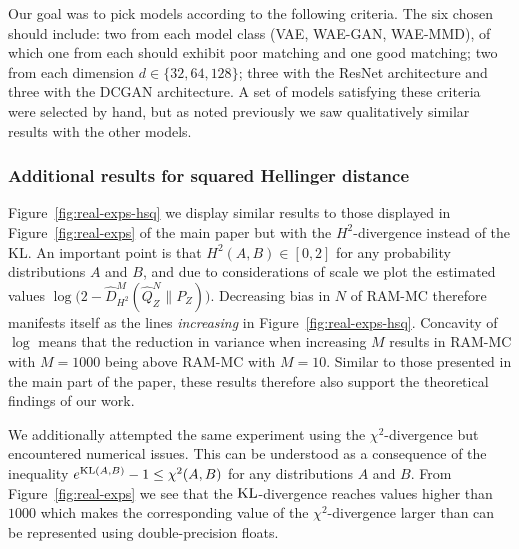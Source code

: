 Our goal was to pick models according to the following criteria. 
The six chosen should include: two from each model class (VAE, WAE-GAN, WAE-MMD), of which one from each should exhibit poor matching and one good matching; two from each dimension $d\in\{32, 64, 128\}$; three with the ResNet architecture and three with the DCGAN architecture.
A set of models satisfying these criteria were selected by hand, but as noted previously we saw qualitatively similar results with the other models.

\subsubsection{Additional results for squared Hellinger distance}\label{appendix:sq-hellinger-results}

Figure~\ref{fig:real-exps-hsq} we display similar results to those displayed in Figure~\ref{fig:real-exps} of the main paper but with the $H^2$-divergence instead of the KL.
An important point is that $H^2(A,B) \in [0, 2]$ for any probability distributions $A$ and $B$,
and due to considerations of scale we plot the estimated values $\log\big(2 - \hat{D}^M_{H^2}(\hat{Q}^N_Z \| P_Z)\big)$.
Decreasing bias in $N$ of RAM-MC therefore manifests itself as the lines \emph{increasing} in Figure~\ref{fig:real-exps-hsq}. 
Concavity of $\log$ means that the reduction in variance when increasing $M$ results in RAM-MC with $M{=}1000$ being above RAM-MC with $M{=}10$.
Similar to those presented in the main part of the paper, these results therefore also support the theoretical findings of our work.

We additionally attempted the same experiment using the $\chi^2$-divergence but encountered numerical issues.
This can be understood as a consequence of the inequality $e^{\mathrm{KL}(A, B)} - 1 \leq \chi^2(A,B)$ for any distributions $A$ and $B$. 
From Figure~\ref{fig:real-exps} we see that the $\mathrm{KL}$-divergence reaches values higher than $1000$ which makes the corresponding value of the $\chi^2$-divergence larger than can be represented using double-precision floats.

